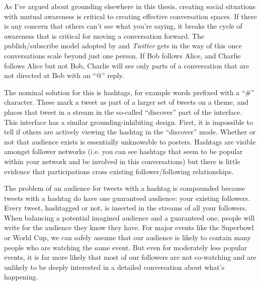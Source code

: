 As I've argued about grounding elsewhere in this thesis, creating social situations with mutual awareness is critical to creating effective conversation spaces. If there is any concern that others can't see what you're saying, it breaks the cycle of awareness that is critical for moving a conversation forward. The publish/subscribe model adopted by and \emph{Twitter} gets in the way of this once conversations scale beyond just one person. If Bob follows Alice, and Charlie follows Alice but not Bob, Charlie will see only parts of a conversation that are not directed at Bob with an ``@'' reply. 

The nominal solution for this is hashtags, for example words prefixed with a ``\#'' character. These mark a tweet as part of a larger set of tweets on a theme, and places that tweet in a stream in the so-called ``discover'' part of the interface. This interface has a similar grounding-inhibiting design. First, it is impossible to tell if others are actively viewing the hashtag in the ``discover'' mode. Whether or not that audience exists is essentially unknowable to posters. Hashtags are visible amongst follower networks (i.e. you can see hashtags that seem to be popular within your network and be involved in this conversations) but there is little evidence that participations cross existing follower/following relationships.

The problem of an audience for tweets with a hashtag is compounded because tweets with a hashtag do have one guaranteed audience: your existing followers. Every tweet, hashtagged or not, is inserted in the streams of all your followers. When balancing a potential imagined audience and a guaranteed one, people will write for the audience they know they have. For major events like the Superbowl or World Cup, we can safely assume that our audience is likely to contain many people who are watching the same event. But even for moderately less popular events, it is far more likely that most of our followers are not co-watching and are unlikely to be deeply interested in a detailed conversation about what's happening. 

